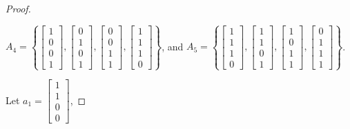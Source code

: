 \documentclass[11pt]{amsart}
\theoremstyle{plain}
\numberwithin{equation}{section}
\theoremstyle{definition}
\begin{document}
\begin{proof}
\begin{center}
    	$A_4 = \left\{\begin{bmatrix}
    		1 \\
    		0 \\
    		0 \\
    		1
    	\end{bmatrix},
    	\begin{bmatrix}
    		0 \\
    		1 \\
    		0 \\
    		1
    	\end{bmatrix},
    	\begin{bmatrix}
    		0 \\
    		0 \\
    		1 \\
    		1
    	\end{bmatrix},
    	\begin{bmatrix}
    		1 \\
    		1 \\
    		1 \\
    		0
    	\end{bmatrix}\right\}$, and 
    	$A_5 = \left\{\begin{bmatrix}
    		1 \\
    		1 \\
    		1 \\
    		0
    	\end{bmatrix},
    	\begin{bmatrix}
    		1 \\
    		1 \\
    		0 \\
    		1
    	\end{bmatrix},
    	\begin{bmatrix}
    		1 \\
    		0 \\
    		1 \\
    		1
    	\end{bmatrix},
    	\begin{bmatrix}
    		0 \\
    		1 \\
    		1 \\
    		1
    	\end{bmatrix}\right\}$.
    \end{center}
    Let $a_1 = \begin{bmatrix}
    	1 \\
    	1 \\
    	0 \\
    	0
    \end{bmatrix}$, 

\end{proof}
\end{document}
